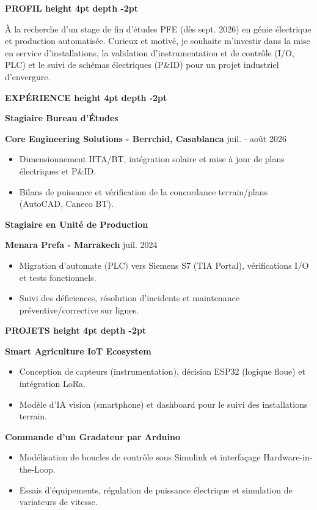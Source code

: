 \documentclass[10pt,a4paper]{altacv}
\makeatletter
\renewcommand{\cvsection}[2][]{%
  \medskip%
  {\color{heading}\LARGE\bfseries #2 \hspace{0.2em}\leaders\vrule height 4pt depth -2pt\hfill\mbox{}}\par\smallskip
}
\renewcommand{\cvevent}[4]{%
  {\large\bfseries\color{accent}#1\par}
  \smallskip\normalsize
  \ifstrequal{#2}{}{}{%
    \textbf{\color{emphasis}#2\ifstrequal{#4}{}{}{ - #4}}%
  }%
  \hfill
  \ifstrequal{#3}{}{}{{\small#3}}%
  \par\smallskip
}
\renewcommand{\makecvheader}{%
  \begingroup
    \raggedright\color{emphasis}%
    {\Huge\bfseries\MakeUppercase{\@name}\par}
    \medskip
    {\large\bfseries\color{accent}\@tagline\par}
    \medskip
    {\footnotesize\bfseries\@personalinfo\par}
  \endgroup\medskip
}
\makeatother
\begin{document}

\makecvheader
\cvsection{PROFIL}
À la recherche d'un stage de fin d'études PFE (dès sept. 2026) en génie électrique et production automatisée. Curieux et motivé, je souhaite m'investir dans la mise en service d'installations, la validation d'instrumentation et de contrôle (I/O, PLC) et le suivi de schémas électriques (P\&ID) pour un projet industriel d'envergure.

\cvsection{EXPÉRIENCE}
\cvevent{Stagiaire Bureau d'Études}{Core Engineering Solutions}{juil. - août 2026}{Berrchid, Casablanca}
\begin{itemize}
\item Dimensionnement HTA/BT, intégration solaire et mise à jour de plans électriques et P\&ID.
\item Bilans de puissance et vérification de la concordance terrain/plans (AutoCAD, Caneco BT).
\end{itemize}
\cvevent{Stagiaire en Unité de Production}{Menara Prefa}{juil. 2024}{Marrakech}
\begin{itemize}
\item Migration d'automate (PLC) vers Siemens S7 (TIA Portal), vérifications I/O et tests fonctionnels.
\item Suivi des déficiences, résolution d'incidents et maintenance préventive/corrective sur lignes.
\end{itemize}

\cvsection{PROJETS}
{\large\bfseries\color{accent} Smart Agriculture IoT Ecosystem}\\[0.05cm]
\begin{itemize}
  \item Conception de capteurs (instrumentation), décision ESP32 (logique floue) et intégration LoRa.
  \item Modèle d'IA vision (smartphone) et dashboard pour le suivi des installations terrain.
\end{itemize}

{\large\bfseries\color{accent} Commande d'un Gradateur par Arduino}\\[0.05cm]
\begin{itemize}
  \item Modélisation de boucles de contrôle sous Simulink et interfaçage Hardware-in-the-Loop.
  \item Essais d'équipements, régulation de puissance électrique et simulation de variateurs de vitesse.
\end{itemize}
\end{document}
